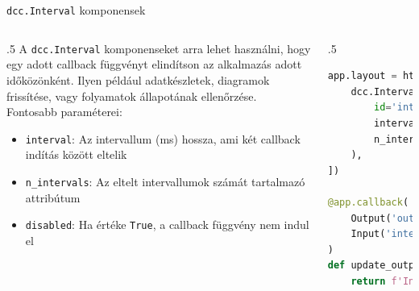 \documentclass[english, aspectratio=169]{beamer}
\begin{document}
	\begin{frame}[fragile]{\texttt{dcc.Interval} komponensek}
		\begin{columns}
			\begin{column}{.5\textwidth}
				A \texttt{dcc.Interval} komponenseket arra lehet használni, hogy egy adott callback függvényt elindítson az alkalmazás adott időközönként. Ilyen például adatkészletek, diagramok frissítése, vagy folyamatok állapotának ellenőrzése. Fontosabb paraméterei:
				\begin{itemize}
					\item \texttt{interval}: Az intervallum (ms) hossza, ami két callback indítás között eltelik
					\item \texttt{n\_intervals}: Az eltelt intervallumok számát tartalmazó attribútum
					\item \texttt{disabled}: Ha értéke \texttt{True}, a callback függvény nem indul el
				\end{itemize}
			\end{column}
			\begin{column}{.5\textwidth}
				\begin{lstlisting}[language=python]
app.layout = html.Div([
	dcc.Interval(
		id='interval-component', 
		interval=1 * 1000,
		n_intervals=0,
	),
])

@app.callback(
	Output('output', 'children'),
	Input('interval-component', 'n_intervals')
)
def update_output(n):
	return f'Interval has triggered {n} times.'				
				\end{lstlisting}
			\end{column}
		\end{columns}
	\end{frame}
	
\end{document}
